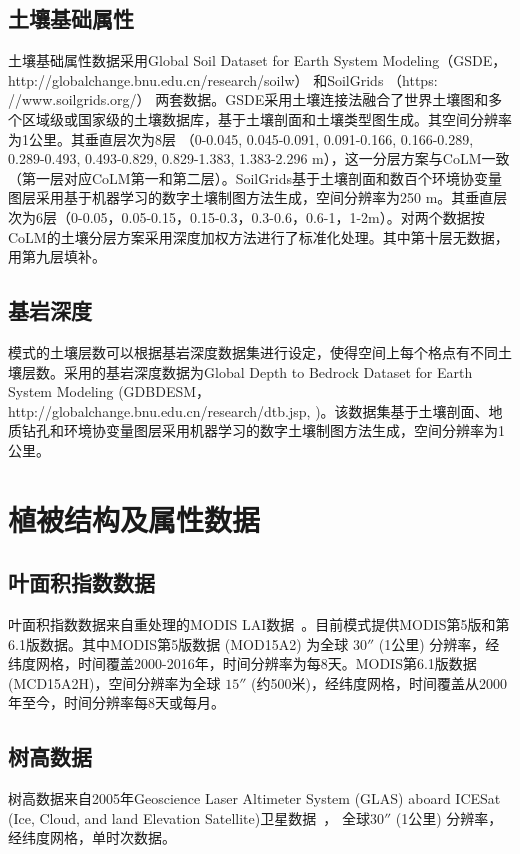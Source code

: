 \subsection{土壤基础属性}\label{土壤基础属性}
土壤基础属性数据采用Global Soil Dataset for Earth System Modeling（GSDE，http://globalchange.bnu.edu.cn/research/soilw） \citep{shangguan2014global}
和SoilGrids （https:\\//www.soilgrids.org/）\citep{poggio2021soilgrids} 两套数据。GSDE采用土壤连接法融合了世界土壤图和多个区域级或国家级的土壤数据库，基于土壤剖面和土壤类型图生成。其空间分辨率为1公里。其垂直层次为8层 （0-0.045, 0.045-0.091, 0.091-0.166, 0.166-0.289, 0.289-0.493, 0.493-0.829, 0.829-1.383, 1.383-2.296 m），这一分层方案与CoLM一致（第一层对应CoLM第一和第二层）。SoilGrids基于土壤剖面和数百个环境协变量图层采用基于机器学习的数字土壤制图方法生成，空间分辨率为250 m。其垂直层次为6层（0-0.05，0.05-0.15，0.15-0.3，0.3-0.6，0.6-1，1-2m）。对两个数据按CoLM的土壤分层方案采用深度加权方法进行了标准化处理。其中第十层无数据，用第九层填补。

\subsection{基岩深度}\label{基岩深度}

模式的土壤层数可以根据基岩深度数据集进行设定，使得空间上每个格点有不同土壤层数。采用的基岩深度数据为Global Depth to Bedrock Dataset for Earth System Modeling (GDBDESM，http://globalchange.bnu.edu.cn/research/dtb.jsp, \citet{shangguan2017mapping})。该数据集基于土壤剖面、地质钻孔和环境协变量图层采用机器学习的数字土壤制图方法生成，空间分辨率为1公里。


\section{植被结构及属性数据}\label{植被结构及属性数据}
\subsection{叶面积指数数据}\label{叶面积指数数据}
叶面积指数数据来自重处理的MODIS LAI数据~\citep{yuan20143d}。目前模式提供MODIS第5版和第6.1版数据。其中MODIS第5版数据 (MOD15A2) 为全球 $30''$ (1公里) 分辨率，经纬度网格，时间覆盖2000-2016年，时间分辨率为每8天。MODIS第6.1版数据 (MCD15A2H)，空间分辨率为全球 $15''$ (约500米)，经纬度网格，时间覆盖从2000年至今，时间分辨率每8天或每月。

\subsection{树高数据}\label{树高数据}
树高数据来自2005年Geoscience Laser Altimeter System (GLAS) aboard ICESat 
(Ice, Cloud, and land Elevation Satellite)卫星数据~\citep{simard2011mapping}，
全球$30''$ (1公里) 分辨率，经纬度网格，单时次数据。

